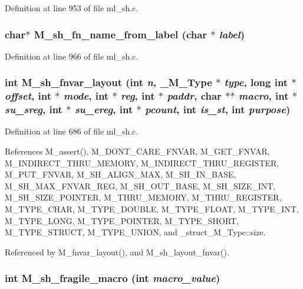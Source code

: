 Definition at line 953 of file ml\_\-sh.c.
\subsubsection{\setlength{\rightskip}{0pt plus 5cm}char$\ast$ M\_\-sh\_\-fn\_\-name\_\-from\_\-label (char $\ast$ {\em label})}\label{ml__sh_8c_d02080c87f351e3b4c285e437912a591}




Definition at line 966 of file ml\_\-sh.c.
\subsubsection{\setlength{\rightskip}{0pt plus 5cm}int M\_\-sh\_\-fnvar\_\-layout (int {\em n}, \bf{\_\-M\_\-Type} $\ast$ {\em type}, long int $\ast$ {\em offset}, int $\ast$ {\em mode}, int $\ast$ {\em reg}, int $\ast$ {\em paddr}, char $\ast$$\ast$ {\em macro}, int $\ast$ {\em su\_\-sreg}, int $\ast$ {\em su\_\-ereg}, int $\ast$ {\em pcount}, int {\em is\_\-st}, int {\em purpose})}\label{ml__sh_8c_a69d78fb760ca80d4afed8e4232196a7}




Definition at line 686 of file ml\_\-sh.c.

References M\_\-assert(), M\_\-DONT\_\-CARE\_\-FNVAR, M\_\-GET\_\-FNVAR, M\_\-INDIRECT\_\-THRU\_\-MEMORY, M\_\-INDIRECT\_\-THRU\_\-REGISTER, M\_\-PUT\_\-FNVAR, M\_\-SH\_\-ALIGN\_\-MAX, M\_\-SH\_\-IN\_\-BASE, M\_\-SH\_\-MAX\_\-FNVAR\_\-REG, M\_\-SH\_\-OUT\_\-BASE, M\_\-SH\_\-SIZE\_\-INT, M\_\-SH\_\-SIZE\_\-POINTER, M\_\-THRU\_\-MEMORY, M\_\-THRU\_\-REGISTER, M\_\-TYPE\_\-CHAR, M\_\-TYPE\_\-DOUBLE, M\_\-TYPE\_\-FLOAT, M\_\-TYPE\_\-INT, M\_\-TYPE\_\-LONG, M\_\-TYPE\_\-POINTER, M\_\-TYPE\_\-SHORT, M\_\-TYPE\_\-STRUCT, M\_\-TYPE\_\-UNION, and \_\-struct\_\-M\_\-Type::size.

Referenced by M\_\-fnvar\_\-layout(), and M\_\-sh\_\-layout\_\-fnvar().
\subsubsection{\setlength{\rightskip}{0pt plus 5cm}int M\_\-sh\_\-fragile\_\-macro (int {\em macro\_\-value})}\label{ml__sh_8c_ee2a00d6153a6bbf4db6f2ad164422cb}




